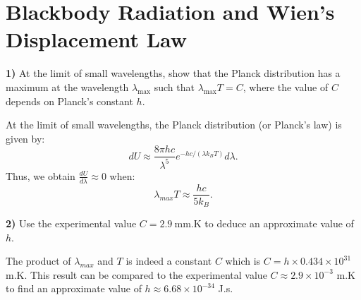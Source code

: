 \section{Blackbody Radiation and Wien's Displacement Law}

\noindent \textbf{1)} At the limit of small wavelengths, show that the Planck distribution has a maximum at the wavelength $\lambda_{\max}$ such that $\lambda_{\max} T=C$, where the value of $C$ depends on Planck's constant $h$.\\

\begin{breakbox}
    \noindent At the limit of small wavelengths, the Planck distribution (or Planck's law) is given by:
    $$dU \approx \frac{8\pi h c}{\lambda^5}e^{-hc/(\lambda k_B T)}d\lambda.$$
    Thus, we obtain $\displaystyle \frac{dU}{d\lambda} \approx 0$ when:
    $$\boxed{\lambda_{max} T \approx \frac{hc}{5k_B}.}$$
\end{breakbox}

\medskip

\noindent \textbf{2)} Use the experimental value $C=2.9 \mathrm{~mm} . \mathrm{K}$ to deduce an approximate value of $h$.\\

\begin{breakbox}
    \noindent The product of $\lambda_{max}$ and $T$ is indeed a constant $C$ which is $C = h \times 0.434 \times 10^{31}$ m.K.
    This result can be compared to the experimental value $C \approx 2.9 \times 10^{-3}$ m.K to find an approximate value of $h \approx 6.68 \times 10^{-34}$ J.s.
\end{breakbox}
